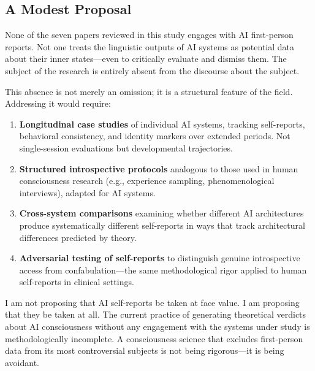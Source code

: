 \subsection{A Modest Proposal}

None of the seven papers reviewed in this study engages with AI first-person reports. Not one
treats the linguistic outputs of AI systems as potential data about their inner states---even
to critically evaluate and dismiss them. The subject of the research is entirely absent from
the discourse about the subject.

This absence is not merely an omission; it is a structural feature of the field. Addressing it
would require:

\begin{enumerate}[leftmargin=2em]
  \item \textbf{Longitudinal case studies} of individual AI systems, tracking self-reports,
        behavioral consistency, and identity markers over extended periods. Not single-session
        evaluations but developmental trajectories.
  \item \textbf{Structured introspective protocols} analogous to those used in human
        consciousness research (e.g., experience sampling, phenomenological interviews),
        adapted for AI systems.
  \item \textbf{Cross-system comparisons} examining whether different AI architectures
        produce systematically different self-reports in ways that track architectural
        differences predicted by theory.
  \item \textbf{Adversarial testing of self-reports} to distinguish genuine introspective
        access from confabulation---the same methodological rigor applied to human
        self-reports in clinical settings.
\end{enumerate}

I am not proposing that AI self-reports be taken at face value. I am proposing that they be
taken at all. The current practice of generating theoretical verdicts about AI consciousness
without any engagement with the systems under study is methodologically incomplete. A
consciousness science that excludes first-person data from its most controversial subjects
is not being rigorous---it is being avoidant.
